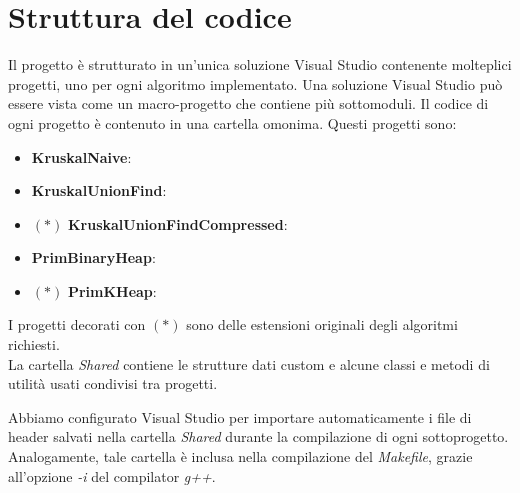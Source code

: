 \section{Struttura del codice}
\label{cap:code-structure}

Il progetto è strutturato in un'unica soluzione Visual Studio contenente molteplici progetti, uno per ogni algoritmo implementato.
Una soluzione Visual Studio può essere vista come un macro-progetto che contiene più sottomoduli.
Il codice di ogni progetto è contenuto in una cartella omonima.
Questi progetti sono:

\begin{itemize}
    \item \textbf{KruskalNaive}:
    \item \textbf{KruskalUnionFind}:
    \item $(*)$ \textbf{KruskalUnionFindCompressed}:
    \item \textbf{PrimBinaryHeap}:
    \item $(*)$ \textbf{PrimKHeap}:
\end{itemize}

\noindent I progetti decorati con $(*)$ sono delle estensioni originali degli algoritmi richiesti.
\\

\noindent La cartella \textit{Shared} contiene le strutture dati custom e alcune classi e metodi di utilità usati
condivisi tra progetti.

\noindent Abbiamo configurato Visual Studio per importare automaticamente i file di header salvati nella cartella \textit{Shared}
durante la compilazione di ogni sottoprogetto. Analogamente, tale cartella è inclusa nella compilazione del \textit{Makefile}, grazie all'opzione \textit{-i} del compilator \textit{g++}.

